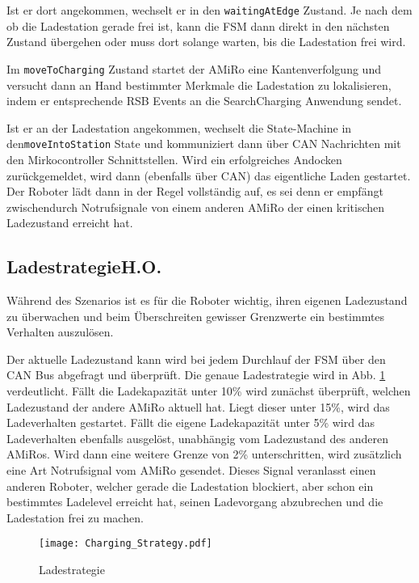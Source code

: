 Ist er dort angekommen, wechselt er in den \texttt{waitingAtEdge} Zustand. Je nach dem ob die Ladestation gerade frei ist, kann die FSM dann direkt in den nächsten Zustand übergehen oder muss dort solange warten, bis die Ladestation frei wird.

Im \texttt{moveToCharging} Zustand startet der AMiRo eine Kantenverfolgung und versucht dann an Hand bestimmter Merkmale die Ladestation zu lokalisieren, indem er entsprechende RSB Events an die SearchCharging Anwendung sendet.

Ist er an der Ladestation angekommen, wechselt die State-Machine in den\linebreak \texttt{moveIntoStation} State und kommuniziert dann über CAN Nachrichten mit den Mirkocontroller Schnittstellen. Wird ein erfolgreiches Andocken zurückgemeldet, wird dann (ebenfalls über CAN) das eigentliche Laden gestartet. Der Roboter lädt dann in der Regel vollständig auf, es sei denn er empfängt zwischendurch Notrufsignale von einem anderen AMiRo der einen kritischen Ladezustand erreicht hat. 

\subsection[Ladestrategie]{Ladestrategie\hfill {\normalsize H.O.}}
Während des Szenarios ist es für die Roboter wichtig, ihren eigenen Ladezustand zu überwachen und beim Überschreiten gewisser Grenzwerte ein bestimmtes Verhalten auszulösen.

Der aktuelle Ladezustand kann wird bei jedem Durchlauf der FSM über den CAN Bus abgefragt und überprüft. Die genaue Ladestrategie wird in Abb. \ref{fig:charging-strategy} verdeutlicht. Fällt die Ladekapazität unter 10\%  wird zunächst überprüft, welchen Ladezustand der andere AMiRo aktuell hat. Liegt dieser unter 15\%, wird das Ladeverhalten gestartet. Fällt die eigene Ladekapazität unter 5\% wird das Ladeverhalten ebenfalls ausgelöst, unabhängig vom Ladezustand des anderen AMiRos. Wird dann eine weitere Grenze von 2\% unterschritten, wird zusätzlich eine Art Notrufsignal vom AMiRo gesendet. Dieses Signal veranlasst einen anderen Roboter, welcher gerade die Ladestation blockiert, aber schon ein bestimmtes Ladelevel erreicht hat, seinen Ladevorgang abzubrechen und die Ladestation frei zu machen.

\begin{figure}[h]
	\begin{center}
		\texttt{[image: Charging\_Strategy.pdf]} 	
		\caption{Ladestrategie}
		\label{fig:charging-strategy}
	\end{center}
\end{figure}

